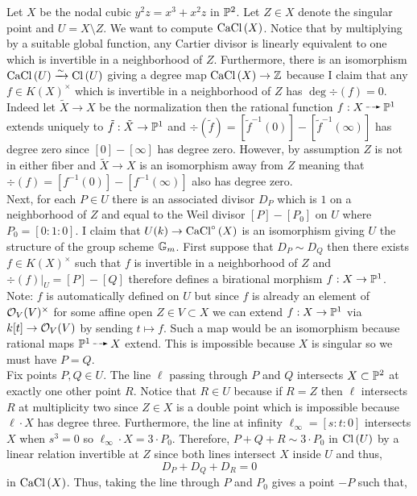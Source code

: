\documentclass[12pt]{article}
\begin{document}
Let $X$ be the nodal cubic $y^2 z = x^3 + x^2 z$ in $\P^2$. Let $Z \in X$ denote the singular point and $U = X \setminus Z$. We want to compute $\CaCl{X}$. Notice that by multiplying by a suitable global function, any Cartier divisor is linearly equivalent to one which is invertible in a neighborhood of $Z$. Furthermore, there is an isomorphism $\CaCl{U} \iso \Cl{U}$ giving a degree map $\CaCl{X} \to \Z$ because I claim that any $f \in K(X)^\times$ which is invertible in a neighborhood of $Z$ has $\deg{\div{(f)}} = 0$. Indeed let $\tilde{X} \to X$ be the normalization then the rational function $f : X \rat \P^1$ extends uniquely to $\tilde{f} : \tilde{X} \to \P^1$ and $\div{(\tilde{f})} = [\tilde{f}^{-1}(0)] - [\tilde{f}^{-1}(\infty)]$ has degree zero since $[0] - [\infty]$ has degree zero. However, by assumption $Z$ is not in either fiber and $\tilde{X} \to X$ is an isomorphism away from $Z$ meaning that $\div{(f)} = [f^{-1}(0)] - [f^{-1}(\infty)]$ also has degree zero. 
\bigskip\\
Next, for each $P \in U$ there is an associated divisor $D_P$ which is $1$ on a neighborhood of $Z$ and equal to the Weil divisor $[P] - [P_0]$ on $U$ where $P_0 = [0:1:0]$. I claim that $U(k) \to \CaClcirc{X}$ is an isomorphism giving $U$ the structure of the group scheme $\Gm$. First suppose that $D_P \sim D_Q$ then there exists $f \in K(X)^\times$ such that $f$ is invertible in a neighborhood of $Z$ and $\div{(f)}|_U = [P] - [Q]$ therefore defines a birational morphism $f : X \to \P^1$. Note: $f$ is automatically defined on $U$ but since $f$ is already an element of $\struct{V}(V)^\times$ for some affine open $Z \in V \subset X$ we can extend $f : X \to \P^1$ via $k[t] \to \struct{V}(V)$ by sending $t \mapsto f$. Such a map would be an isomorphism because rational maps $\P^1 \rat X$ extend. This is impossible because $X$ is singular so we must have $P = Q$.
\bigskip\\
Fix points $P,Q \in U$. The line $\ell$ passing through $P$ and $Q$ intersects $X \subset \P^2$ at exactly one other point $R$. Notice that $R \in U$ because if $R = Z$ then $\ell$ intersects $R$ at multiplicity two since $Z \in X$ is a double point which is impossible because $\ell \cdot X$ has degree three. Furthermore, the line at infinity $\ell_\infty = [s : t : 0]$ intersects $X$ when $s^3 = 0$ so $\ell_\infty \cdot X = 3 \cdot P_0$. Therefore, $P + Q + R \sim 3 \cdot P_0$ in $\Cl{U}$ by a linear relation invertible at $Z$ since both lines intersect $X$ inside $U$ and thus,
\[ D_P + D_Q + D_R = 0 \]
in $\CaCl{X}$. Thus, taking the line through $P$ and $P_0$ gives a point $-P$ such that,
\end{document}
